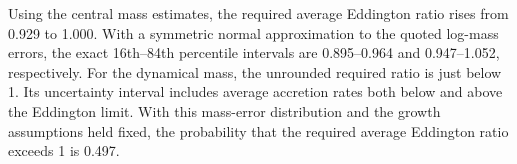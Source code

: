 Using the central mass estimates, the required average Eddington ratio rises from 0.929 to 1.000. With a symmetric normal approximation to the quoted log-mass errors, the exact 16th--84th percentile intervals are 0.895--0.964 and 0.947--1.052, respectively. For the dynamical mass, the unrounded required ratio is just below 1. Its uncertainty interval includes average accretion rates both below and above the Eddington limit. With this mass-error distribution and the growth assumptions held fixed, the probability that the required average Eddington ratio exceeds 1 is 0.497.
